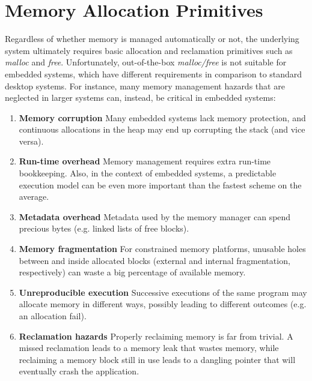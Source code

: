 \documentclass{llncs}
\begin{document}
\begin{comment}
As far as we know, the only XXX programming language targeting WSNs that 
supports automatic memory management is Java~\cite{wsn.java} (through the 
\emph{Djarelling}~\cite{wsn.djar} and \emph{Takatuka} VMs).

all threads share a single stack~\cite{wsn.java}
quais os problemas disso?
\end{comment}

\section{Memory Allocation Primitives}

Regardless of whether memory is managed automatically or not, the underlying 
system ultimately requires basic allocation and reclamation primitives such as 
\emph{malloc} and \emph{free}.
%
Unfortunately, out-of-the-box \emph{malloc/free} is not suitable for embedded 
systems, which have different requirements in comparison to standard desktop 
systems.
%
For instance, many memory management hazards that are neglected in larger 
systems can, instead, be critical in embedded systems:

\begin{enumerate}
\item \textbf{Memory corruption}
    Many embedded systems lack memory protection, and continuous allocations in 
    the heap may end up corrupting the stack (and vice versa).

\item \textbf{Run-time overhead}
    Memory management requires extra run-time bookkeeping.
    Also, in the context of embedded systems, a predictable execution model can 
    be even more important than the fastest scheme on the average.

\item \textbf{Metadata overhead}
    Metadata used by the memory manager can spend precious bytes (e.g. linked 
    lists of free blocks).

\item \textbf{Memory fragmentation}
    For constrained memory platforms, unusable holes between and inside 
    allocated blocks (external and internal fragmentation, respectively) can 
waste a big percentage of available memory.

\item \textbf{Unreproducible execution}
    Successive executions of the same program may allocate memory in different 
    ways, possibly leading to different outcomes (e.g. an allocation fail).

\item \textbf{Reclamation hazards}
    Properly reclaiming memory is far from trivial.
    A missed reclamation leads to a memory leak that wastes memory, while 
    reclaiming a memory block still in use leads to a dangling pointer that 
will eventually crash the application.
\end{enumerate}
\end{document}
